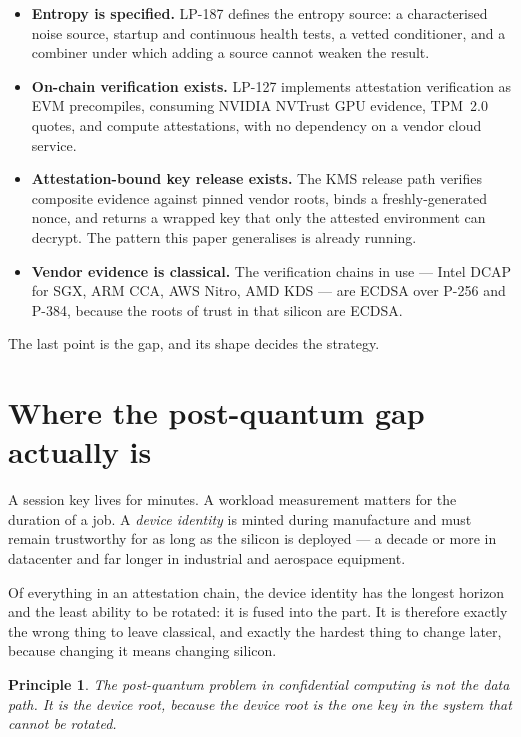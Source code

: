 \documentclass[11pt,a4paper]{article}
\newtheorem{principle}{Principle}
\begin{document}
\begin{itemize}
\item \textbf{Entropy is specified.} LP-187 defines the entropy source: a
characterised noise source, startup and continuous health tests, a vetted
conditioner, and a combiner under which adding a source cannot weaken the
result.
\item \textbf{On-chain verification exists.} LP-127 implements attestation
verification as EVM precompiles, consuming NVIDIA NVTrust GPU evidence, TPM~2.0
quotes, and compute attestations, with no dependency on a vendor cloud service.
\item \textbf{Attestation-bound key release exists.} The KMS release path
verifies composite evidence against pinned vendor roots, binds a
freshly-generated nonce, and returns a wrapped key that only the attested
environment can decrypt. The pattern this paper generalises is already running.
\item \textbf{Vendor evidence is classical.} The verification chains in use ---
Intel DCAP for SGX, ARM CCA, AWS Nitro, AMD KDS --- are ECDSA over P-256 and
P-384, because the roots of trust in that silicon are ECDSA.
\end{itemize}

The last point is the gap, and its shape decides the strategy.

\section{Where the post-quantum gap actually is}

A session key lives for minutes. A workload measurement matters for the
duration of a job. A \emph{device identity} is minted during manufacture and
must remain trustworthy for as long as the silicon is deployed --- a decade or
more in datacenter and far longer in industrial and aerospace equipment.

Of everything in an attestation chain, the device identity has the longest
horizon and the least ability to be rotated: it is fused into the part. It is
therefore exactly the wrong thing to leave classical, and exactly the hardest
thing to change later, because changing it means changing silicon.

\begin{principle}
The post-quantum problem in confidential computing is not the data path. It is
the device root, because the device root is the one key in the system that
cannot be rotated.
\end{principle}
\end{document}
